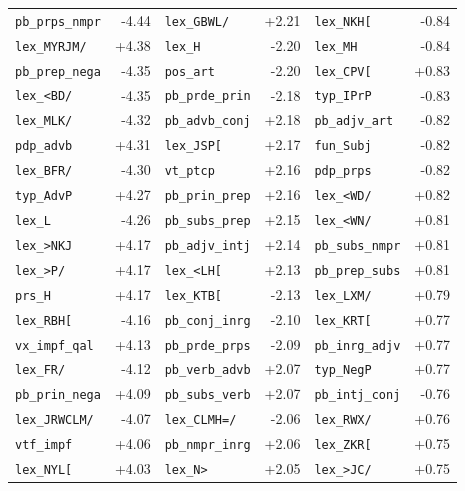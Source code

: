 \begin{longtable}{lrlrlr}
\texttt{pb\_prps\_nmpr} & -4.44 & \texttt{lex\_GBWL/} & +2.21 & \texttt{lex\_NKH[} & -0.84 \\
\texttt{lex\_MYRJM/} & +4.38 & \texttt{lex\_H} & -2.20 & \texttt{lex\_MH} & -0.84 \\
\texttt{pb\_prep\_nega} & -4.35 & \texttt{pos\_art} & -2.20 & \texttt{lex\_CPV[} & +0.83 \\
\texttt{lex\_\textless{}BD/} & -4.35 & \texttt{pb\_prde\_prin} & -2.18 & \texttt{typ\_IPrP} & -0.83 \\
\texttt{lex\_MLK/} & -4.32 & \texttt{pb\_advb\_conj} & +2.18 & \texttt{pb\_adjv\_art} & -0.82 \\
\texttt{pdp\_advb} & +4.31 & \texttt{lex\_JSP[} & +2.17 & \texttt{fun\_Subj} & -0.82 \\
\texttt{lex\_BFR/} & -4.30 & \texttt{vt\_ptcp} & +2.16 & \texttt{pdp\_prps} & -0.82 \\
\texttt{typ\_AdvP} & +4.27 & \texttt{pb\_prin\_prep} & +2.16 & \texttt{lex\_\textless{}WD/} & +0.82 \\
\texttt{lex\_L} & -4.26 & \texttt{pb\_subs\_prep} & +2.15 & \texttt{lex\_\textless{}WN/} & +0.81 \\
\texttt{lex\_\textgreater{}NKJ} & +4.17 & \texttt{pb\_adjv\_intj} & +2.14 & \texttt{pb\_subs\_nmpr} & +0.81 \\
\texttt{lex\_\textgreater{}P/} & +4.17 & \texttt{lex\_\textless{}LH[} & +2.13 & \texttt{pb\_prep\_subs} & +0.81 \\
\texttt{prs\_H} & +4.17 & \texttt{lex\_KTB[} & -2.13 & \texttt{lex\_LXM/} & +0.79 \\
\texttt{lex\_RBH[} & -4.16 & \texttt{pb\_conj\_inrg} & -2.10 & \texttt{lex\_KRT[} & +0.77 \\
\texttt{vx\_impf\_qal} & +4.13 & \texttt{pb\_prde\_prps} & -2.09 & \texttt{pb\_inrg\_adjv} & +0.77 \\
\texttt{lex\_FR/} & -4.12 & \texttt{pb\_verb\_advb} & +2.07 & \texttt{typ\_NegP} & +0.77 \\
\texttt{pb\_prin\_nega} & +4.09 & \texttt{pb\_subs\_verb} & +2.07 & \texttt{pb\_intj\_conj} & -0.76 \\
\texttt{lex\_JRWCLM/} & -4.07 & \texttt{lex\_CLMH=/} & -2.06 & \texttt{lex\_RWX/} & +0.76 \\
\texttt{vtf\_impf} & +4.06 & \texttt{pb\_nmpr\_inrg} & +2.06 & \texttt{lex\_ZKR[} & +0.75 \\
\texttt{lex\_NYL[} & +4.03 & \texttt{lex\_N\textgreater{}} & +2.05 & \texttt{lex\_\textgreater{}JC/} & +0.75 \\

\end{longtable}
